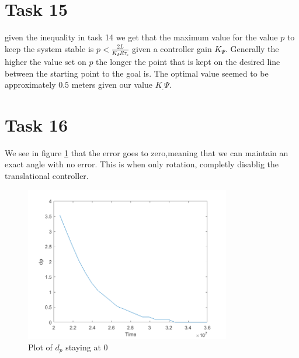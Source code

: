 \documentclass[a4paper,12pt,oneside,onecolumn]{article} %
\begin{document}
\section*{Task 15}

given the inequality in task 14 we get that the maximum value for the value $p$ to keep the system stable is $p<\frac{2 L }{K_\Psi R \tau_s}$ given a controller gain $K_\Psi$. Generally the higher the value set on $p$ the longer the point that is kept on the desired line between the starting point to the goal is. The optimal value seemed to be approximately $0.5$ meters given our value $K_.\Psi$.

\section*{Task 16}

We see in figure \ref{16} that the error goes to zero,meaning that we can maintain an exact angle with no error. This is when only rotation, completly disablig the translational controller. 


\begin{figure}[H]
\begin{center}	
  \includegraphics[width = 0.8\textwidth]{task16.png}
  \caption{Plot of $d_p$ staying at 0}\label{16}
 \end{center}
\end{figure}
\end{document}
